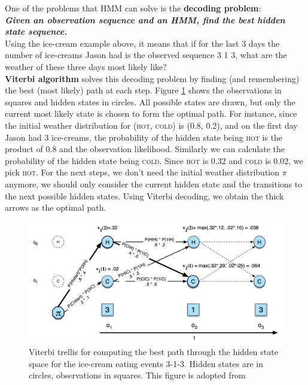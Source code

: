 \documentclass[nobib]{tufte-handout}
\begin{document}
One of the problems that HMM can solve is the \textbf{decoding problem}:\\
\bigskip
\textbf{\textit{Given an observation sequence and an HMM, find the best hidden state sequence.}}\\
\bigskip
Using the ice-cream example above, it means that if for the last 3 days the number of ice-creams Jason had is the observed sequence 3 1 3, what are the weather of these three days most likely like?\\
\textbf{Viterbi algorithm} solves this decoding problem by finding (and remembering) the best (most likely) path at each step. Figure \ref{fig:vi} shows the observations in squares and hidden states in circles. All possible states are drawn, but only the current most likely state is chosen to form the optimal path. For instance, since the initial weather distribution for (\textsc{hot}, \textsc{cold}) is (0.8, 0.2), and on the first day Jason had 3 ice-creams, the probability of the hidden state being \textsc{hot} is the product of 0.8 and the observation likelihood. Similarly we can calculate the probability of the hidden state being \textsc{cold}. Since \textsc{hot} is 0.32 and \textsc{cold} is 0.02, we pick \textsc{hot}. For the next steps, we don't need the initial weather distribution $\pi$ anymore, we should only consider the current hidden state and the transitions to the next possible hidden states. Using Viterbi decoding, we obtain the thick arrows as the optimal path.

\begin{figure}
 \includegraphics[width=1\textwidth]{viterbi.png}
  \caption{Viterbi trellis for computing the best path through the hidden state space for the ice-cream eating events 3-1-3. Hidden states are in circles, observations in squares. This figure is adopted from \cite{slp}}
  \label{fig:vi}
\end{figure}
\end{document}
